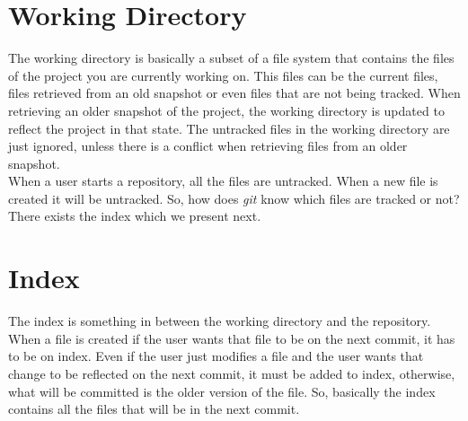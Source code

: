 \section{Working Directory}

The working directory is basically a subset of
a file system that contains the files of the project you are
currently working on. This files can be the current files, files
retrieved from an old snapshot or even files that are not being
tracked. When retrieving an older snapshot of the project, the
working directory is updated to reflect the project in that state. The
untracked files in the working directory are just ignored, unless
there is a conflict when retrieving files from an older snapshot.\\

When a user starts a repository, all the files are untracked. When a
new file is created it will be untracked. So, how does \emph{git} know which
files are tracked or not? There exists the index which we present
next.

\section{Index}
The index is something in between the working directory and the
repository. When a file is created if the user wants that file to be
on the next commit, it has to be on index. Even if the user just
modifies a file and the user wants that change to be reflected on the
next commit, it must be added to index, otherwise, what will be
committed is the older version of the file. So, basically the index
contains all the files that will be in the next commit.\\

